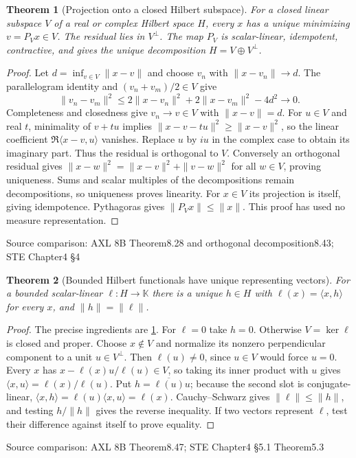 \documentclass[11pt,oneside,openany]{book}
\newtheorem{theorem}{Theorem}[chapter]
\theoremstyle{definition}
\theoremstyle{remark}
\newcommand{\ip}[2]{\langle#1,#2\rangle}
\newcommand{\family}[1]{}
\newcommand{\source}[1]{\par\begingroup\small\sffamily\color{black!65}Source comparison: #1\par\endgroup}
\begin{document}
\begin{theorem}[Projection onto a closed Hilbert subspace]\family{D11.20.orthogonal_projection}\label{d11:20:orthogonal-projection}
For a closed linear subspace $V$ of a real or complex Hilbert space $H$, every $x$ has a unique minimizing $v=P_Vx\in V$. The residual lies in $V^\perp$. The map $P_V$ is scalar-linear, idempotent, contractive, and gives the unique decomposition $H=V\oplus V^\perp$.
\end{theorem}
\begin{proof}
Let $d=\inf_{v\in V}\|x-v\|$ and choose $v_n$ with $\|x-v_n\|\to d$. The parallelogram identity and $(v_n+v_m)/2\in V$ give
\[\|v_n-v_m\|^2\le2\|x-v_n\|^2+2\|x-v_m\|^2-4d^2\longrightarrow0.
\]
Completeness and closedness give $v_n\to v\in V$ with $\|x-v\|=d$. For $u\in V$ and real $t$, minimality of $v+tu$ implies $\|x-v-tu\|^2\ge\|x-v\|^2$, so the linear coefficient $\Re\ip{x-v}u$ vanishes. Replace $u$ by $iu$ in the complex case to obtain its imaginary part. Thus the residual is orthogonal to $V$. Conversely an orthogonal residual gives $\|x-w\|^2=\|x-v\|^2+\|v-w\|^2$ for all $w\in V$, proving uniqueness. Sums and scalar multiples of the decompositions remain decompositions, so uniqueness proves linearity. For $x\in V$ its projection is itself, giving idempotence. Pythagoras gives $\|P_Vx\|\le\|x\|$. This proof has used no measure representation.
\end{proof}
\source{AXL 8B Theorem8.28 and orthogonal decomposition8.43; STE Chapter4 §4}

\begin{theorem}[Bounded Hilbert functionals have unique representing vectors]\family{D11.20.hilbert_riesz}\label{d11:20:hilbert-riesz}
For a bounded scalar-linear $\ell:H\to\mathbb K$ there is a unique $h\in H$ with $\ell(x)=\ip x h$ for every $x$, and $\|h\|=\|\ell\|$.
\end{theorem}
\begin{proof}
The precise ingredients are \cref{d11:20:orthogonal-projection}. For $\ell=0$ take $h=0$. Otherwise $V=\ker\ell$ is closed and proper. Choose $x\notin V$ and normalize its nonzero perpendicular component to a unit $u\in V^\perp$. Then $\ell(u)\ne0$, since $u\in V$ would force $u=0$. Every $x$ has $x-\ell(x)u/\ell(u)\in V$, so taking its inner product with $u$ gives $\ip x u=\ell(x)/\ell(u)$. Put $h=\overline{\ell(u)}u$; because the second slot is conjugate-linear, $\ip x h=\ell(u)\ip x u=\ell(x)$. Cauchy--Schwarz gives $\|\ell\|\le\|h\|$, and testing $h/\|h\|$ gives the reverse inequality. If two vectors represent $\ell$, test their difference against itself to prove equality.
\end{proof}
\source{AXL 8B Theorem8.47; STE Chapter4 §5.1 Theorem5.3}
\end{document}
